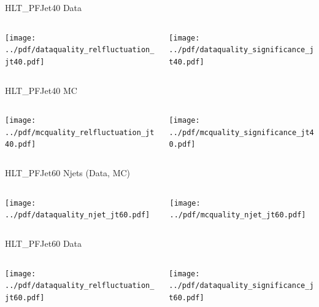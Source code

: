 \documentclass[9pt]{beamer}
\begin{document}
\begin{frame}[t]{HLT\_PFJet40 Data}
\begin{columns}[T]
  \begin{column}{.5\textwidth}
  \texttt{[image: ../pdf/dataquality\_relfluctuation\_jt40.pdf]}
  \end{column}
  \begin{column}{.5\textwidth}
  \texttt{[image: ../pdf/dataquality\_significance\_jt40.pdf]}
  \end{column}
\end{columns}
\end{frame}

\begin{frame}[t]{HLT\_PFJet40 MC}
\begin{columns}[T]
  \begin{column}{.5\textwidth}
  \texttt{[image: ../pdf/mcquality\_relfluctuation\_jt40.pdf]}
  \end{column}
  \begin{column}{.5\textwidth}
  \texttt{[image: ../pdf/mcquality\_significance\_jt40.pdf]}
  \end{column}
\end{columns}
\end{frame}

\begin{frame}[t]{HLT\_PFJet60 Njets (Data, MC)}
\begin{columns}[T]
  \begin{column}{.5\textwidth}
  \texttt{[image: ../pdf/dataquality\_njet\_jt60.pdf]}
  \end{column}
  \begin{column}{.5\textwidth}
  \texttt{[image: ../pdf/mcquality\_njet\_jt60.pdf]}
  \end{column}
\end{columns}
\end{frame}

\begin{frame}[t]{HLT\_PFJet60 Data}
\begin{columns}[T]
  \begin{column}{.5\textwidth}
  \texttt{[image: ../pdf/dataquality\_relfluctuation\_jt60.pdf]}
  \end{column}
  \begin{column}{.5\textwidth}
  \texttt{[image: ../pdf/dataquality\_significance\_jt60.pdf]}
  \end{column}
\end{columns}
\end{frame}
\end{document}
